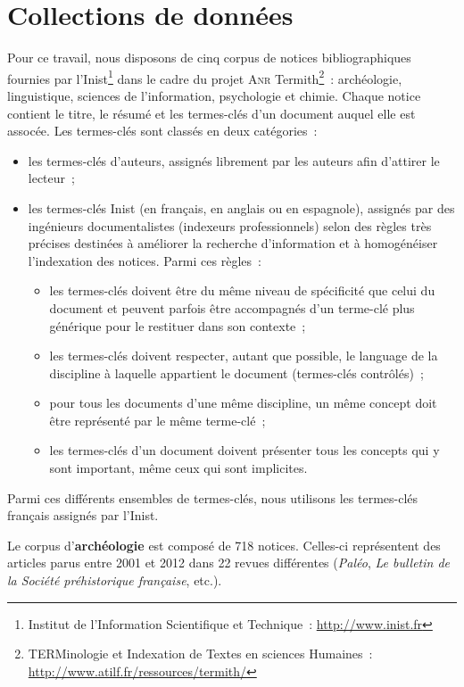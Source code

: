 \section{Collections de données}
\label{sec:presentation_des_donnees}
  Pour ce travail, nous disposons de cinq corpus de notices bibliographiques
  fournies par l'Inist\footnote{Institut de l'Information Scientifique et
  Technique~: \url{http://www.inist.fr}} dans le cadre du projet \textsc{Anr}
  Termith\footnote{TERMinologie et Indexation de Textes en sciences Humaines~:
  \url{http://www.atilf.fr/ressources/termith/}}~: archéologie, linguistique,
  sciences de l'information, psychologie et chimie.
  Chaque notice contient le titre, le résumé et les termes-clés d'un document
  auquel elle est assocée. Les termes-clés sont classés en deux catégories~:
  \begin{itemize}
    \item{les termes-clés d'auteurs, assignés librement par les auteurs afin
          d'attirer le lecteur~;}
    \item{les termes-clés Inist (en français, en anglais ou en espagnole),
          assignés par des ingénieurs documentalistes (indexeurs professionnels)
          selon des règles très précises destinées à améliorer la recherche
          d'information et à homogénéiser l'indexation des notices. Parmi ces
          règles~:}
    \begin{itemize}
      \item{les termes-clés doivent être du même niveau de spécificité que celui
            du document et peuvent parfois être accompagnés d'un terme-clé plus
            générique pour le restituer dans son contexte~;}
      \item{les termes-clés doivent respecter, autant que possible, le language
            de la discipline à laquelle appartient le document (termes-clés
            contrôlés)~;}
      \item{pour tous les documents d'une même discipline, un même concept doit
            être représenté par le même terme-clé~;}
      \item{les termes-clés d'un document doivent présenter tous les concepts
            qui y sont important, même ceux qui sont implicites.}
    \end{itemize}
  \end{itemize}
  Parmi ces différents ensembles de termes-clés, nous utilisons les termes-clés
  français assignés par l'Inist.

  Le corpus d'\textbf{archéologie} est composé de 718 notices. Celles-ci
  représentent des articles parus entre 2001 et 2012 dans 22 revues différentes
  (\textit{Paléo}, \textit{Le bulletin de la Société préhistorique française},
  etc.).

